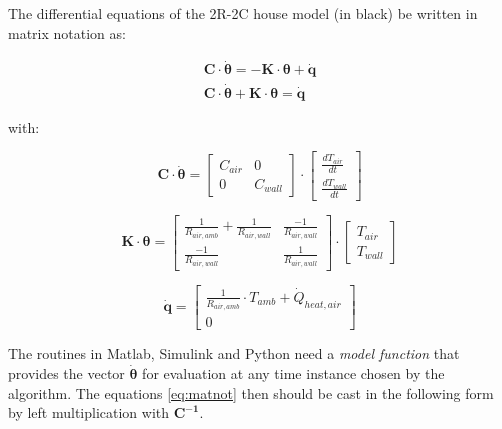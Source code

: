 The differential equations of the 2R-2C house model (in black) be written in matrix notation as:

\begin{subequations}
	\label{eq:matnot}
	\begin{align}
		\mathbf{C} \cdot \boldsymbol{\dot{\theta}} = - \mathbf{K} \cdot \boldsymbol{\theta} + \mathbf{\dot{q}} \\ 
		\mathbf{C} \cdot \boldsymbol{\dot{\theta}} + \mathbf{K} \cdot \boldsymbol{\theta} = \mathbf{\dot{q}}
	\end{align}
\end{subequations}

with:

\begin{equation}
	\mathbf{C} \cdot \boldsymbol{\dot{\theta}} =
	\begin{bmatrix}
		C_{air} & 0 \\
		0 &  C_{wall}
	\end{bmatrix}
	\cdot
	\begin{bmatrix}
		\frac{dT_{air}}{dt} \\
		\frac{dT_{wall}}{dt}
	\end{bmatrix}
\end{equation}

\begin{equation}
	\mathbf{K} \cdot \boldsymbol{\theta} =
	\begin{bmatrix}
		\frac{1}{R_{air, amb}} + \frac{1}{R_{air, wall}} & \frac{-1}{R_{air, wall}} \\
		\frac{-1}{R_{air, wall}} &  \frac{1}{R_{air, wall}}
	\end{bmatrix}
	\cdot
	\begin{bmatrix}
		T_{air} \\
		T_{wall}
	\end{bmatrix}
\end{equation}

\begin{equation}
	\mathbf{\dot{q}} =
	\begin{bmatrix}
		\frac{1}{R_{air, amb}} \cdot T_{amb} + \dot{Q}_{heat, air} \\
		0
	\end{bmatrix}
\end{equation}



The routines in Matlab, Simulink and Python need a \emph{model function} that provides the vector $\boldsymbol{\dot{\theta}}$ for evaluation at any time instance chosen by the algorithm. The equations \eqref{eq:matnot} then should be cast in the following form by left multiplication with $\mathbf{C^{-1}}$.

